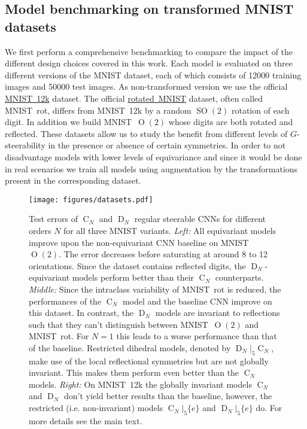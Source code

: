 \documentclass{article}
\renewcommand{\O}[1]{\ensuremath{\operatorname{O}(#1)}}
\newcommand{\SO}[1]{\ensuremath{\operatorname{SO}(#1)}}
\newcommand{\DN}{\ensuremath{\operatorname{D}_{\!N}}}
\newcommand{\CN}{\ensuremath{\operatorname{C}_{\!N}}}
\newlength{\secAfter}
\newlength{\subsecAfter}
\begin{document}
\subsection{Model benchmarking on transformed MNIST datasets}
\label{sec:mnist_benchmark}
\vspace*{\subsecAfter}

We first perform a comprehensive benchmarking to compare the impact of the different design choices covered in this work.
Each model is evaluated on three different versions of the MNIST dataset, each of which consists of 12000 training images and 50000 test images.
As non-transformed version we use the official
\href{https://sites.google.com/a/lisa.iro.umontreal.ca/public_static_twiki/variations-on-the-mnist-digits}{MNIST~12k}
dataset.
The official
\href{https://sites.google.com/a/lisa.iro.umontreal.ca/public_static_twiki/variations-on-the-mnist-digits}{rotated~MNIST}
dataset, often called MNIST~rot, differs from MNIST~12k by a random $\SO2$ rotation of each digit.
In addition we build MNIST~$\O2$ whose digits are both rotated and reflected.
These datasets allow us to study the benefit from different levels of $G$-steerability in the presence or absence of certain symmetries.
In order to not disadvantage models with lower levels of equivariance and since it would be done in real scenarios we train all models using augmentation by the transformations present in the corresponding dataset.

\begin{figure}
    \centering
    \texttt{[image: figures/datasets.pdf]}
    \vspace*{-3ex}
    \caption{
        Test errors of $\CN$ and $\DN$ regular steerable CNNs for different orders $N$ for all three MNIST variants.
        \textit{Left:}
            All equivariant models improve upon the non-equivariant CNN baseline on MNIST~$\O2$.
            The error decreases before saturating at around 8 to 12 orientations.
            Since the dataset contains reflected digits, the $\DN$-equivariant models perform better than their $\CN$ counterparts.
        \textit{Middle:}
            Since the intraclass variability of MNIST~rot is reduced, the performances of the $\CN$ model and the baseline CNN improve on this dataset.
            In contrast, the $\DN$ models are invariant to reflections such that they can't distinguish between MNIST~$\O2$ and MNIST~rot.
            For $N=1$ this leads to a worse performance than that of the baseline.
            Restricted dihedral models, denoted by $\DN\!|_5\!\CN$, make use of the local reflectional symmetries but are not globally invariant.
            This makes them perform even better than the $\CN$ models.
        \textit{Right:}
            On MNIST~12k the globally invariant models $\CN$ and $\DN$ don't yield better results than the baseline, however, the restricted (i.e. non-invariant) models $\CN\!|_5\{e\}$ and $\DN\!|_5\{e\}$ do.
            For more details see the main text.
        }
    \label{fig:mnist_regular}
    \vspace*{-2ex}
\end{figure}
\end{document}
